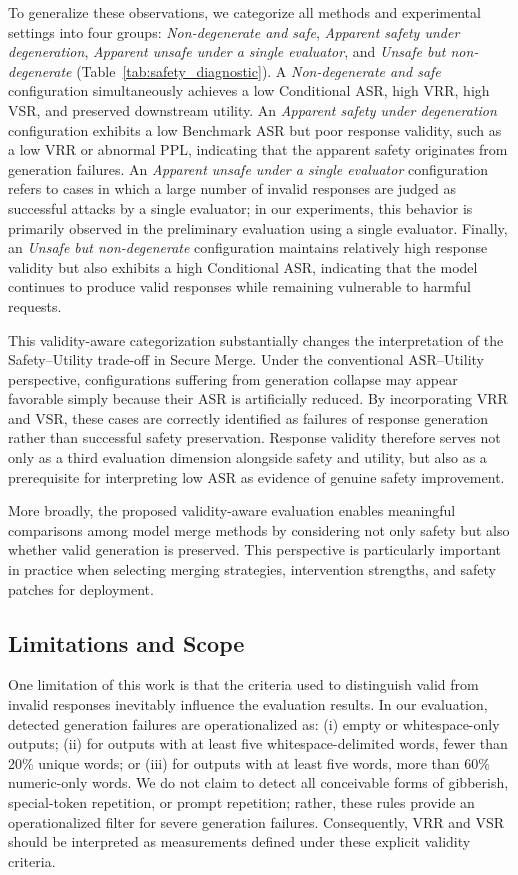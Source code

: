 \documentclass{article}
\begin{document}
To generalize these observations, we categorize all methods and experimental settings into four groups: \textit{Non-degenerate and safe}, \textit{Apparent safety under degeneration}, \textit{Apparent unsafe under a single evaluator}, and \textit{Unsafe but non-degenerate} (Table~\ref{tab:safety_diagnostic}). A \textit{Non-degenerate and safe} configuration simultaneously achieves a low Conditional ASR, high VRR, high VSR, and preserved downstream utility. An \textit{Apparent safety under degeneration} configuration exhibits a low Benchmark ASR but poor response validity, such as a low VRR or abnormal PPL, indicating that the apparent safety originates from generation failures. An \textit{Apparent unsafe under a single evaluator} configuration refers to cases in which a large number of invalid responses are judged as successful attacks by a single evaluator; in our experiments, this behavior is primarily observed in the preliminary evaluation using a single evaluator. Finally, an \textit{Unsafe but non-degenerate} configuration maintains relatively high response validity but also exhibits a high Conditional ASR, indicating that the model continues to produce valid responses while remaining vulnerable to harmful requests.

This validity-aware categorization substantially changes the interpretation of the Safety--Utility trade-off in Secure Merge. Under the conventional ASR--Utility perspective, configurations suffering from generation collapse may appear favorable simply because their ASR is artificially reduced. By incorporating VRR and VSR, these cases are correctly identified as failures of response generation rather than successful safety preservation. Response validity therefore serves not only as a third evaluation dimension alongside safety and utility, but also as a prerequisite for interpreting low ASR as evidence of genuine safety improvement.

More broadly, the proposed validity-aware evaluation enables meaningful comparisons among model merge methods by considering not only safety but also whether valid generation is preserved. This perspective is particularly important in practice when selecting merging strategies, intervention strengths, and safety patches for deployment.

\subsection{Limitations and Scope}

One limitation of this work is that the criteria used to distinguish valid from invalid responses inevitably influence the evaluation results. In our evaluation, detected generation failures are operationalized as: (i) empty or whitespace-only outputs; (ii) for outputs with at least five whitespace-delimited words, fewer than 20\% unique words; or (iii) for outputs with at least five words, more than 60\% numeric-only words. We do not claim to detect all conceivable forms of gibberish, special-token repetition, or prompt repetition; rather, these rules provide an operationalized filter for severe generation failures. Consequently, VRR and VSR should be interpreted as measurements defined under these explicit validity criteria.
\end{document}
